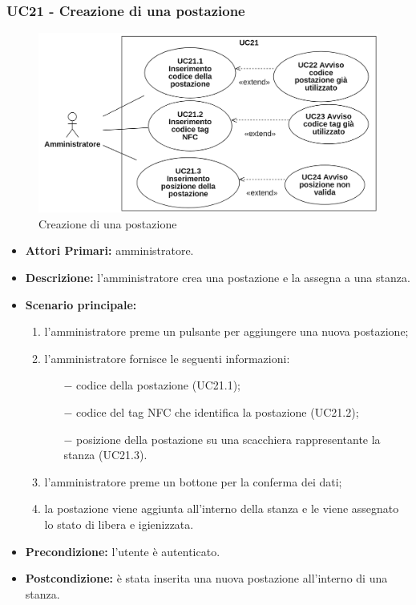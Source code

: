 \subsubsection{UC21 - Creazione di una postazione}
\begin{figure}[H]
	\centering
	\includegraphics[width=18cm]{res/images/UC21.png}
	\caption{Creazione di una postazione}
\end{figure}
\begin{itemize}
	\item\textbf{Attori Primari:}
	amministratore.
	\item\textbf{Descrizione:}
	l'amministratore crea una postazione e la assegna a una stanza.
	\item\textbf{Scenario principale:} 
	\begin{enumerate}
		\item l'amministratore preme un pulsante per aggiungere una nuova postazione;
		\item l'amministratore fornisce le seguenti informazioni:
		\begin{itemize}
			\item[$-$] codice della postazione (UC21.1);
			\item[$-$] codice del tag NFC che identifica la postazione (UC21.2);
			\item[$-$] posizione della postazione su una scacchiera rappresentante la stanza (UC21.3).
		\end{itemize}
		\item l'amministratore preme un bottone per la conferma dei dati;
		\item la postazione viene aggiunta all'interno della stanza e le viene assegnato lo stato di libera e igienizzata.
	\end{enumerate}
	\item\textbf{Precondizione:} 
	l'utente è autenticato.
	\item\textbf{Postcondizione:}
	è stata inserita una nuova postazione all'interno di una stanza.
\end{itemize}

